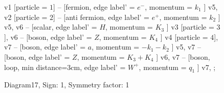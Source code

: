 \documentclass{revtex4}
\begin{document}
\begin{figure}[!htb]
\begin{center}
{    %
v1 [particle = \(1\)] -- [fermion, edge label' = \(e^{-}\), momentum = \(k_{1}\) ] v5, 
v2 [particle = \(2\)] -- [anti fermion, edge label' = \(e^{+}\), momentum = \(k_{2}\) ] v5, 
v6 -- [scalar, edge label' = \(H\), momentum = \(K_{3}\) ] v3 [particle = \(3\)], 
v6 -- [boson, edge label' = \(Z\), momentum = \(K_{4}\) ] v4 [particle = \(4\)], 
v7 -- [boson, edge label' = \(a\), momentum = \(-k_{1} - k_{2}\) ] v5, 
v7 -- [boson, edge label' = \(Z\), momentum = \(K_{3} + K_{4}\) ] v6, 
v7 -- [boson, loop, min distance=3cm, edge label' = \(W^{+}\), momentum = \(q_{1}\) ] v7, 
};
\end{center}
\caption{Diagram17, Sign: 1, Symmetry factor: 1}
\end{figure}
\newpage
\end{document}
